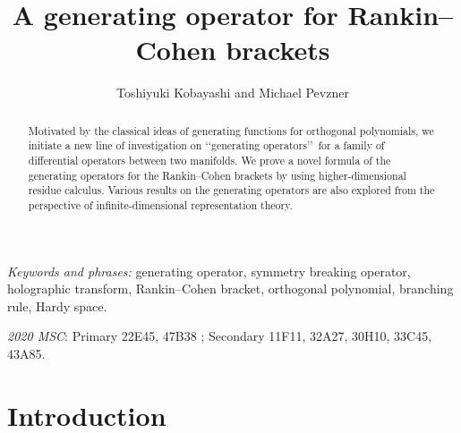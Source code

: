 \documentclass[12pt,leqno]{amsart}
\theoremstyle{plain}
\theoremstyle{definition}
\begin{document}
\title{A generating operator for Rankin--Cohen brackets}
\author{Toshiyuki Kobayashi and
Michael Pevzner}


\maketitle

\begin{abstract}
Motivated by the classical ideas of generating functions
 for orthogonal polynomials, 
 we initiate a new line of
 investigation
 on \lq\lq{generating operators}\rq\rq\
 for a family of differential operators
between two manifolds.  
We prove a novel formula of the generating operators
 for the Rankin--Cohen brackets
 by using higher-dimensional residue calculus.  
Various results on the generating operators are also explored from the perspective of infinite-dimensional representation theory.  
\end{abstract}

\noindent
\textit{Keywords and phrases:}
generating operator, symmetry breaking operator, holographic transform, 
Rankin--Cohen bracket, orthogonal polynomial, branching rule, Hardy space.  

\medskip
\noindent
\textit{2020 MSC}:
Primary
22E45, %
47B38%
;
Secondary
11F11, %
32A27, %
30H10, %
33C45, %
43A85.%

\section{Introduction}
\label{sec:Intro}
\end{document}
